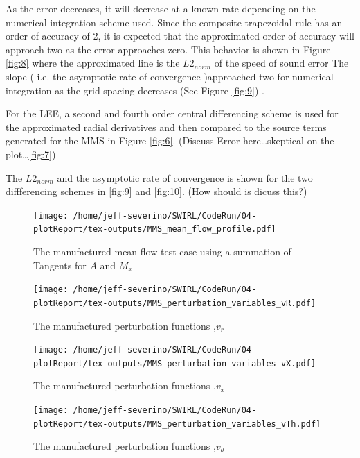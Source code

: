 As the error decreases, it will decrease at a known rate depending on the numerical
integration scheme used. Since the composite trapezoidal rule has an order of accuracy of 2, 
it is expected that the approximated order of accuracy will approach two as
the error approaches zero. This behavior is shown in Figure \ref{fig:8} where the approximated
line is the $L2_{norm}$ of the speed of sound error 
 The slope ( i.e. the asymptotic rate of convergence )approached two for 
 numerical integration as the grid spacing decreases (See Figure \ref{fig:9}) .

For the LEE, a second and fourth order central differencing scheme is used
for the approximated radial derivatives and then compared to the source terms 
generated for the MMS in Figure \ref{fig:6}. (Discuss Error here\dots skeptical 
on the plot\dots \ref{fig:7})

The $L2_{norm}$ and the  asymptotic rate of convergence is shown for the 
two diffferencing schemes in  \ref{fig:9} and \ref{fig:10}. (How should is dicuss this?) 


\begin{figure}[!]
    \centering
    \texttt{[image: /home/jeff-severino/SWIRL/CodeRun/04-plotReport/tex-outputs/MMS\_mean\_flow\_profile.pdf]}
    \caption{The manufactured mean flow test case using a summation of Tangents for $A$ and $M_x$}
    \label{fig:1}
\end{figure}


\begin{figure}[!]
    \centering
    \texttt{[image: /home/jeff-severino/SWIRL/CodeRun/04-plotReport/tex-outputs/MMS\_perturbation\_variables\_vR.pdf]}
\caption{The manufactured perturbation functions ,$v_r$}%
    \label{fig:1a}
\end{figure}


\begin{figure}[!]
    \centering
    \texttt{[image: /home/jeff-severino/SWIRL/CodeRun/04-plotReport/tex-outputs/MMS\_perturbation\_variables\_vX.pdf]}
\caption{The manufactured perturbation functions ,$v_x$}%
    \label{fig:2a}
\end{figure}


\begin{figure}[!]
    \centering
    \texttt{[image: /home/jeff-severino/SWIRL/CodeRun/04-plotReport/tex-outputs/MMS\_perturbation\_variables\_vTh.pdf]}
    \caption{The manufactured perturbation functions ,$v_{\theta}$}%
    \label{fig:3a}
\end{figure}



